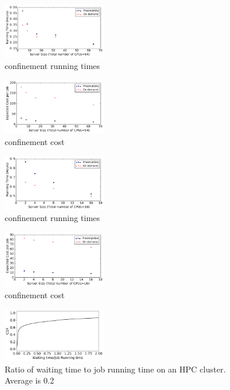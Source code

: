 \begin{figure}[h]
  \centering
  \includegraphics[width=0.4\textwidth]{../graphs/confin_64_time.pdf}
  \caption{confinement running times}
  \label{fig:confin-64-times}
\end{figure}


\begin{figure}[h]
  \centering
  \includegraphics[width=0.4\textwidth]{../graphs/confin_64_cost.pdf}
  \caption{confinement cost}
  \label{fig:confin-64-cost}
\end{figure}



\begin{figure}[h]
  \centering
  \includegraphics[width=0.4\textwidth]{../graphs/confin_16_time.pdf}
  \caption{confinement running times}
  \label{fig:confin-16-times}
\end{figure}


\begin{figure}[h]
  \centering
  \includegraphics[width=0.4\textwidth]{../graphs/confin_16_cost.pdf}
  \caption{confinement cost}
  \label{fig:confin-16-cost}
\end{figure}



\begin{figure}
  \includegraphics[width=0.4\textwidth]{../data/waiting_all.pdf}
  \caption{Ratio of waiting time to job running time on an HPC cluster. Average is 0.2}
  \label{fig:hpc-wait-cdf}
\end{figure}


